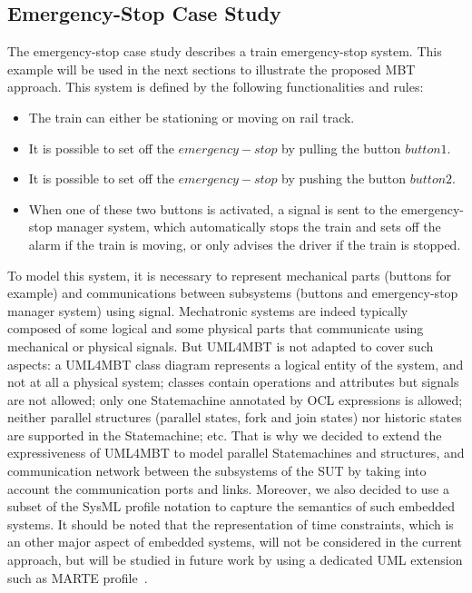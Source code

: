 \documentclass{llncs}
\begin{document}
\subsection{Emergency-Stop Case Study}
The emergency-stop case study describes a train emergency-stop
system. This example will be used in the next sections to illustrate
the proposed MBT approach. This system is defined by the following
functionalities and rules: 
\begin{itemize}
\vspace*{-.25cm}
  \item The train can either be stationing or moving on rail track.
  \item It is possible to set off the $emergency-stop$ by pulling the button
  $button1$.
  \item It is possible to set off the $emergency-stop$ by
    pushing the button $button2$. 
  \item When one of these two buttons is activated, a signal is sent to the
  emergency-stop manager system, which automatically stops the train
  and sets off the alarm if the train is moving, or only advises the
  driver if the train is stopped. 
\end{itemize}

To model this system, it is necessary to represent mechanical parts
(buttons for example) and communications between subsystems (buttons
and emergency-stop manager system) using signal. Mechatronic systems
are indeed typically composed of some logical and some physical parts 
that communicate using mechanical or physical signals. But UML4MBT is not 
adapted to cover such aspects: a UML4MBT class
diagram represents a logical entity of the system, and not at
all a physical system; classes contain operations and attributes but
signals are not allowed; only one Statemachine annotated by OCL
expressions is allowed; neither parallel structures (parallel states,
fork and join states) nor historic states are supported in the
Statemachine; etc. 
That is why we decided to extend the expressiveness of UML4MBT to model 
parallel Statemachines and structures, and communication network between the subsystems of the SUT by taking 
into account the communication ports and links. Moreover, we also decided 
to use a subset of the SysML profile notation to capture the semantics of such
embedded systems. It
should be noted that the representation of time constraints, which
is an other major aspect of embedded systems, will
not be considered in the current approach, but will be studied in
future work by using a dedicated UML extension such as
MARTE profile~\cite{Marte}.
\vspace*{-.25cm}
\end{document}
